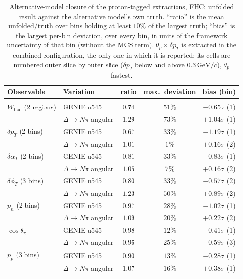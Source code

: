 \documentclass[11pt,a4paper]{article}
\newcommand{\GeVc}{\,\text{GeV}\!/c}
\begin{document}
\begin{table}[H]
  \centering
  \caption{Alternative-model closure of the proton-tagged extractions, FHC: unfolded result against the
    alternative model's own truth. ``ratio'' is the mean unfolded/truth over bins holding at least $10\%$
    of the largest truth; ``bias'' is the largest per-bin deviation, over every bin, in units of the
    framework uncertainty of that bin (without the MCS term). $\theta_p\times\delta p_T$ is extracted in the combined configuration, the only one
    in which it is reported; its cells are numbered outer slice by outer slice ($\delta p_T$ below and above
    $0.3\GeVc$), $\theta_p$ fastest.}
  \label{tab:pt_altmodel}
  \small
  \begin{tabular}{llccc}
    \toprule
    Observable & Variation & ratio & max.\ deviation & bias (bin) \\
    \midrule
    \multicolumn{5}{l}{} \\
    $W_\mathrm{had}$ (2 regions) & GENIE u545 & $0.74$ & $51\%$ & $-0.65\sigma$ (1) \\
                     & $\Delta\to N\pi$ angular & $1.29$ & $73\%$ & $+1.04\sigma$ (1) \\
    $\delta p_T$ (2 bins) & GENIE u545 & $0.67$ & $33\%$ & $-1.19\sigma$ (1) \\
                     & $\Delta\to N\pi$ angular & $1.01$ & $1\%$ & $+0.16\sigma$ (2) \\
    $\delta\alpha_T$ (2 bins) & GENIE u545 & $0.81$ & $33\%$ & $-0.83\sigma$ (1) \\
                     & $\Delta\to N\pi$ angular & $1.05$ & $7\%$ & $+0.16\sigma$ (2) \\
    $\delta\phi_T$ (3 bins) & GENIE u545 & $0.80$ & $33\%$ & $-0.57\sigma$ (2) \\
                     & $\Delta\to N\pi$ angular & $1.23$ & $50\%$ & $+0.89\sigma$ (2) \\
    $p_n$ (2 bins) & GENIE u545 & $0.97$ & $28\%$ & $-1.02\sigma$ (1) \\
                     & $\Delta\to N\pi$ angular & $1.09$ & $20\%$ & $+0.22\sigma$ (2) \\
    $\cos\theta_\pi$ & GENIE u545 & $0.98$ & $12\%$ & $-0.41\sigma$ (1) \\
                     & $\Delta\to N\pi$ angular & $0.96$ & $25\%$ & $-0.59\sigma$ (3) \\
    $p_p$ (3 bins) & GENIE u545 & $0.90$ & $13\%$ & $-0.28\sigma$ (1) \\
                     & $\Delta\to N\pi$ angular & $1.07$ & $16\%$ & $+0.38\sigma$ (1) \\

\end{tabular}
\end{table}
\end{document}
